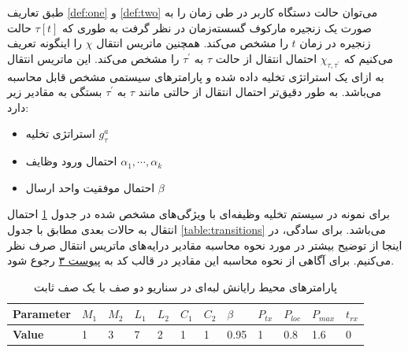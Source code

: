 طبق تعاریف \ref{def:one} و \ref{def:two} می‌توان حالت دستگاه کاربر در طی زمان را به صورت یک زنجیره مارکوف گسسته‌زمان در نظر گرفت به طوری که $\tau[t]$ حالت زنجیره در زمان $t$ را مشخص می‌کند. همچنین ماتریس انتقال $\chi$ را اینگونه تعریف می‌کنیم که $\chi_{\tau, \tau^{\prime}}$ احتمال انتقال از حالت $\tau$ به \(\tau^{\prime}\) را مشخص می‌کند. این ماتریس انتقال به ازای یک استراتژی تخلیه داده شده و پارامترهای سیستمی مشخص قابل محاسبه می‌باشد. به طور دقیق‌تر احتمال انتقال از حالتی مانند 
$\tau$
به 
$\tau^\prime$
بستگی به مقادیر زیر دارد:
\begin{itemize}
	\item استراتژی تخلیه $g_\tau^a$
	\item احتمال ورود وظایف $\alpha_1, \cdots, \alpha_k$
	\item احتمال موفقیت واحد ارسال $\beta$
\end{itemize}
برای نمونه در سیستم تخلیه وظیفه‌ای با ویژگی‌های مشخص شده در جدول \ref{table:fixedranged2} احتمال انتقال به حالات بعدی مطابق با جدول \ref{table:transitions} می‌باشد. برای سادگی، در اینجا از توضیح بیشتر در مورد نحوه محاسبه مقادیر درایه‌های ماتریس انتقال صرف نظر می‌کنیم. برای آگاهی از نحوه محاسبه این مقادیر در قالب کد به \hyperref[appendix:3]{پیوست ۳} رجوع شود.
\begin{table}[H]
	\centering
	\begin{latin}
		\begin{tabular}{@{}llllllllllll@{}}
			\toprule
			\textbf{Parameter} & $M_1$ & $M_2$ & $L_1$ & $L_2$ & $C_1$ & $C_2$ & $\beta$ & $P_{tx}$ & $P_{loc}$ & $P_{max}$ & $t_{rx}$ \\ \midrule
			\textbf{Value}     & 1     & 3     & 7     & 2     & 1     & 1     & 0.95    & 1        & 0.8       & 1.6       & 0        \\ \bottomrule
		\end{tabular}
	\end{latin}
	\caption{پارامترهای محیط رایانش لبه‌ای در سناریو دو صف با یک صف ثابت}
	\label{table:fixedranged2}
\end{table}

